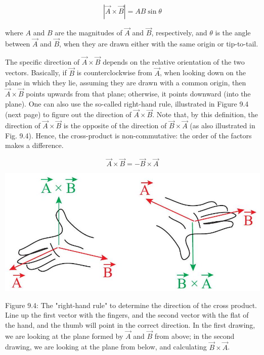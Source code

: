 \documentclass[10pt]{article}
\begin{document}
\begin{equation*}
|\vec{A} \times \vec{B}|=A B \sin \theta \tag{9.9}
\end{equation*}


where $A$ and $B$ are the magnitudes of $\vec{A}$ and $\vec{B}$, respectively, and $\theta$ is the angle between $\vec{A}$ and $\vec{B}$, when they are drawn either with the same origin or tip-to-tail.

The specific direction of $\vec{A} \times \vec{B}$ depends on the relative orientation of the two vectors. Basically, if $\vec{B}$ is counterclockwise from $\vec{A}$, when looking down on the plane in which they lie, assuming they are drawn with a common origin, then $\vec{A} \times \vec{B}$ points upwards from that plane; otherwise, it points downward (into the plane). One can also use the so-called right-hand rule, illustrated in Figure 9.4 (next page) to figure out the direction of $\vec{A} \times \vec{B}$. Note that, by this definition, the direction of $\vec{A} \times \vec{B}$ is the opposite of the direction of $\vec{B} \times \vec{A}$ (as also illustrated in Fig. 9.4). Hence, the cross-product is non-commutative: the order of the factors makes a difference.


\begin{equation*}
\vec{A} \times \vec{B}=-\vec{B} \times \vec{A} \tag{9.10}
\end{equation*}


\begin{center}
\includegraphics[max width=\textwidth]{2024_09_14_9969b06773f10b6936e8g-216}
\end{center}

Figure 9.4: The "right-hand rule" to determine the direction of the cross product. Line up the first vector with the fingers, and the second vector with the flat of the hand, and the thumb will point in the correct direction. In the first drawing, we are looking at the plane formed by $\vec{A}$ and $\vec{B}$ from above; in the second drawing, we are looking at the plane from below, and calculating $\vec{B} \times \vec{A}$.
\end{document}
